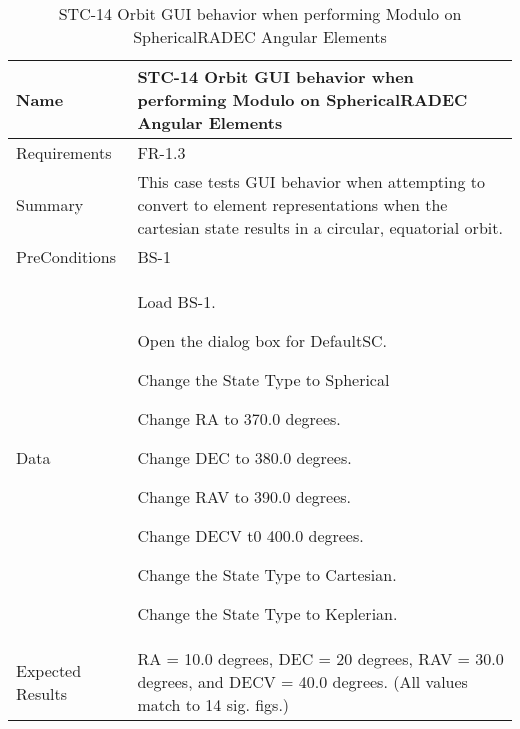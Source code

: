 
\begin{table}[htbp!]
\centering
      \begin{tabular}{|p{1.05 in} |p{4.75 in} |}
      \hline
         \rowcolor[rgb]{0.8,0.8,0.8} Name & STC-14 Orbit GUI behavior when performing Modulo on SphericalRADEC Angular Elements\\
         \hline
         Requirements & FR-1.3\\  \hline
         Summary &
         This  case tests GUI behavior when attempting to convert to element representations when the
         cartesian state results in a circular, equatorial orbit.
         \\     \hline
         PreConditions & BS-1\\     \hline
         Data &
         \begin{compactenum}
             \item Load BS-1.
             \item Open the dialog box for DefaultSC.
             \item Change the State Type to Spherical
             \item Change RA to 370.0 degrees.
             \item Change DEC to 380.0 degrees.
             \item Change RAV to 390.0 degrees.
             \item Change DECV t0 400.0 degrees.
             \item Change the State Type to Cartesian.
             \item Change the State Type to Keplerian.
         \end{compactenum}
         \\ \hline
         Expected Results & RA = 10.0 degrees, DEC = 20 degrees, RAV = 30.0 degrees, and DECV = 40.0 degrees. (All
         values match to 14 sig. figs.)\\
      \hline
      \end{tabular}
      \label{Table:STC-14}
      \caption{STC-14 Orbit GUI behavior when performing Modulo on SphericalRADEC Angular Elements}
\end{table} 